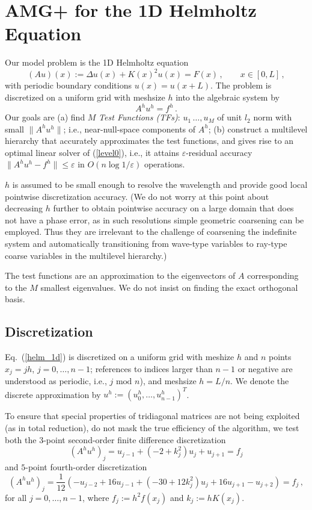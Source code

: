 \documentclass{article}
\begin{document}
\section{AMG+ for the 1D Helmholtz Equation}
\label{helm_linear}
Our model problem is the 1D Helmholtz equation
\begin{equation}
	\label{helm1d}
	(A u)(x) := \Delta u(x) + K(x)^2 u(x) = F(x)\,,\qquad x \in [0,L]\,,
\end{equation}
with periodic boundary conditions $u(x) = u(x + L)$. 
The problem is discretized on a uniform grid with meshsize $h$ into the algebraic system by
\begin{equation}
	\label{level0}
	A^h u^h = f^h\,.
\end{equation}
Our goals are (a) find $M$ \emph{Test Functions (TFs)}: $u_1\,\dots,u_M$ of unit $l_2$ norm with small $\|A^h u^h\|$; i.e., near-null-space components of $A^h$; (b) construct a multilevel hierarchy that accurately approximates the test functions, and gives rise to an optimal linear solver of (\ref{level0}), i.e., it attains $\varepsilon$-residual accuracy $\|A^h u^h - f^h \| \leq\varepsilon$ in $O(n \log 1/\varepsilon)$ operations.

$h$ is assumed to be small enough to resolve the wavelength and provide good local pointwise discretization accuracy. (We do not worry at this point about decreasing $h$ further to obtain pointwise accuracy on a large domain that does not have a phase error, as in such resolutions simple geometric coarsening can be employed. Thus they are irrelevant to the challenge of coarsening the indefinite system and automatically transitioning from wave-type variables to ray-type coarse variables in the multilevel hierarchy.)

The test functions are an approximation to the eigenvectors of $A$ corresponding to the $M$ smallest eigenvalues. We do not insist on finding the exact orthogonal basis.

\subsection{Discretization}
\label{discretization}
Eq.~(\ref{helm_1d}) is discretized on a uniform grid with meshize $h$ and $n$ points $x_j = j h$, $j= 0,\dots,n-1$; references to indices larger than $n - 1$ or negative are understood as periodic, i.e., $j \text{ mod } n$), and meshsize $h = L/n$. We denote the discrete approximation by $u^h := (u^h_0,\dots,u^h_{n-1})^T$.

To ensure that special properties of tridiagonal matrices are not being exploited (as in total reduction), 
do not mask the true efficiency of the algorithm, we test both the $3$-point second-order finite difference discretization 
$$ (A^h u^h)_j = u_{j-1} + (-2 + k_j^2) u_j + u_{j+1} = f_j$$
and $5$-point  fourth-order discretization
$$ (A^h u^h)_j = \frac{1}{12} \left( -u_{j-2} + 16 u_{j-1} + (-30 + 12 k_j^2) u_j + 16 u_{j+1} - u_{j+2} \right) = f_j\,, $$
for all $j = 0,\dots,n-1$, where $f_j := h^2 f(x_j)$ and $k_j := h K(x_j)$.
\end{document}
